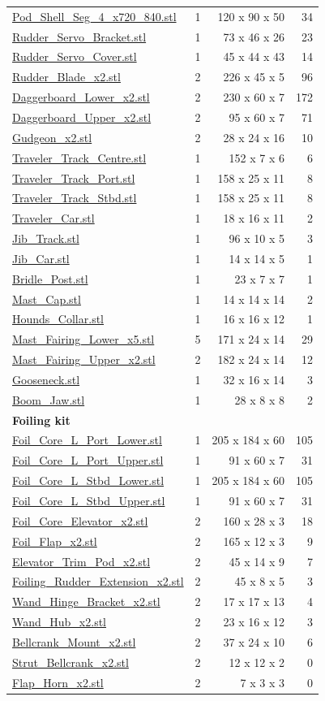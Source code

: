 \documentclass[11pt]{article}
\begin{document}
{\begin{longtable}{lcrr}
\url{Pod_Shell_Seg_4_x720_840.stl} & 1 & 120 x 90 x 50 & 34 \\
\url{Rudder_Servo_Bracket.stl} & 1 & 73 x 46 x 26 & 23 \\
\url{Rudder_Servo_Cover.stl} & 1 & 45 x 44 x 43 & 14 \\
\url{Rudder_Blade_x2.stl} & 2 & 226 x 45 x 5 & 96 \\
\url{Daggerboard_Lower_x2.stl} & 2 & 230 x 60 x 7 & 172 \\
\url{Daggerboard_Upper_x2.stl} & 2 & 95 x 60 x 7 & 71 \\
\url{Gudgeon_x2.stl} & 2 & 28 x 24 x 16 & 10 \\
\url{Traveler_Track_Centre.stl} & 1 & 152 x 7 x 6 & 6 \\
\url{Traveler_Track_Port.stl} & 1 & 158 x 25 x 11 & 8 \\
\url{Traveler_Track_Stbd.stl} & 1 & 158 x 25 x 11 & 8 \\
\url{Traveler_Car.stl} & 1 & 18 x 16 x 11 & 2 \\
\url{Jib_Track.stl} & 1 & 96 x 10 x 5 & 3 \\
\url{Jib_Car.stl} & 1 & 14 x 14 x 5 & 1 \\
\url{Bridle_Post.stl} & 1 & 23 x 7 x 7 & 1 \\
\url{Mast_Cap.stl} & 1 & 14 x 14 x 14 & 2 \\
\url{Hounds_Collar.stl} & 1 & 16 x 16 x 12 & 1 \\
\url{Mast_Fairing_Lower_x5.stl} & 5 & 171 x 24 x 14 & 29 \\
\url{Mast_Fairing_Upper_x2.stl} & 2 & 182 x 24 x 14 & 12 \\
\url{Gooseneck.stl} & 1 & 32 x 16 x 14 & 3 \\
\url{Boom_Jaw.stl} & 1 & 28 x 8 x 8 & 2 \\
\midrule
\multicolumn{4}{l}{\textbf{Foiling kit}}\\
\url{Foil_Core_L_Port_Lower.stl} & 1 & 205 x 184 x 60 & 105 \\
\url{Foil_Core_L_Port_Upper.stl} & 1 & 91 x 60 x 7 & 31 \\
\url{Foil_Core_L_Stbd_Lower.stl} & 1 & 205 x 184 x 60 & 105 \\
\url{Foil_Core_L_Stbd_Upper.stl} & 1 & 91 x 60 x 7 & 31 \\
\url{Foil_Core_Elevator_x2.stl} & 2 & 160 x 28 x 3 & 18 \\
\url{Foil_Flap_x2.stl} & 2 & 165 x 12 x 3 & 9 \\
\url{Elevator_Trim_Pod_x2.stl} & 2 & 45 x 14 x 9 & 7 \\
\url{Foiling_Rudder_Extension_x2.stl} & 2 & 45 x 8 x 5 & 3 \\
\url{Wand_Hinge_Bracket_x2.stl} & 2 & 17 x 17 x 13 & 4 \\
\url{Wand_Hub_x2.stl} & 2 & 23 x 16 x 12 & 3 \\
\url{Bellcrank_Mount_x2.stl} & 2 & 37 x 24 x 10 & 6 \\
\url{Strut_Bellcrank_x2.stl} & 2 & 12 x 12 x 2 & 0 \\
\url{Flap_Horn_x2.stl} & 2 & 7 x 3 x 3 & 0 \\
\bottomrule
\end{longtable}}
\end{document}
